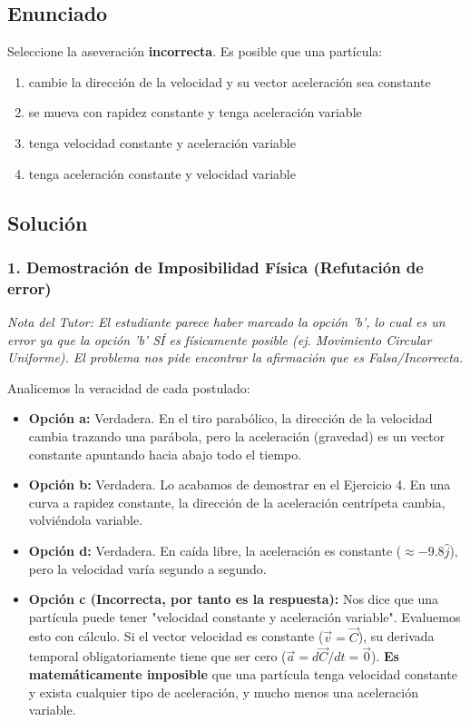 \documentclass[12pt, a4paper]{article}
\begin{document}
\newpage

\subsection*{Enunciado}
Seleccione la aseveración \textbf{incorrecta}. Es posible que una partícula:
\begin{enumerate}[label=\alph*)]
    \item cambie la dirección de la velocidad y su vector aceleración sea constante
    \item se mueva con rapidez constante y tenga aceleración variable
    \item tenga velocidad constante y aceleración variable
    \item tenga aceleración constante y velocidad variable
\end{enumerate}

\subsection*{Solución}

\subsubsection*{1. Demostración de Imposibilidad Física (Refutación de error)}
\textit{Nota del Tutor: El estudiante parece haber marcado la opción 'b', lo cual es un error ya que la opción 'b' SÍ es físicamente posible (ej. Movimiento Circular Uniforme). El problema nos pide encontrar la afirmación que es Falsa/Incorrecta.}

Analicemos la veracidad de cada postulado:
\begin{itemize}
    \item \textbf{Opción a:} Verdadera. En el tiro parabólico, la dirección de la velocidad cambia trazando una parábola, pero la aceleración (gravedad) es un vector constante apuntando hacia abajo todo el tiempo.
    \item \textbf{Opción b:} Verdadera. Lo acabamos de demostrar en el Ejercicio 4. En una curva a rapidez constante, la dirección de la aceleración centrípeta cambia, volviéndola variable.
    \item \textbf{Opción d:} Verdadera. En caída libre, la aceleración es constante ($\approx -9.8 \hat{j}$), pero la velocidad varía segundo a segundo.
    \item \textbf{Opción c (Incorrecta, por tanto es la respuesta):} Nos dice que una partícula puede tener "velocidad constante y aceleración variable". Evaluemos esto con cálculo. Si el vector velocidad es constante ($\vec{v} = \vec{C}$), su derivada temporal obligatoriamente tiene que ser cero ($\vec{a} = d\vec{C}/dt = \vec{0}$). \textbf{Es matemáticamente imposible} que una partícula tenga velocidad constante y exista cualquier tipo de aceleración, y mucho menos una aceleración variable.
\end{itemize}
\end{document}
